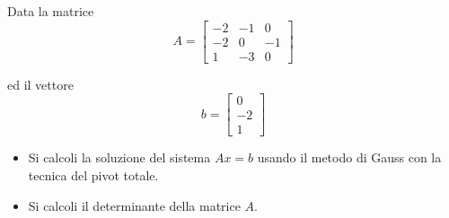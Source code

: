 Data la matrice
\bigskip
\[
A=\left[
\begin{array}{ccc}
-2 & -1 & 0 \\
-2 & 0 & -1\\
1 & -3 & 0
\end{array}\right]
\]

ed il vettore
\bigskip
\[
b=\left[
\begin{array}{ccc}
0\\
-2 \\
1
\end{array}\right]
\]
\begin{itemize}
\item Si calcoli la soluzione del sistema $Ax=b$ usando il metodo
di Gauss con la tecnica del pivot totale.
\item Si calcoli il determinante della matrice $A$.
\end{itemize}
